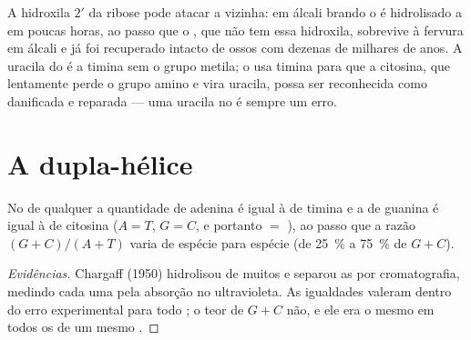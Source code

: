 \begin{example}\label{ex:b1:nucleic-acids:fragile}
A hidroxila $2'$ da ribose pode atacar a  vizinha:
em álcali brando o  é hidrolisado a  em poucas horas, ao
passo que o , que não tem essa hidroxila, sobrevive à fervura em
álcali e já foi recuperado intacto de ossos com dezenas de milhares de
anos. A uracila do  é a timina sem o grupo metila; o  usa timina
para que a citosina, que lentamente perde o grupo amino e vira uracila,
possa ser reconhecida como danificada e reparada --- uma uracila no 
é sempre um erro.
\end{example}

\section{A dupla-hélice}

\begin{proposition}\label{prop:b1:nucleic-acids:chargaff}
No  de qualquer  a quantidade de adenina é igual à de timina
e a de guanina é igual à de citosina ($A = T$, $G = C$, e portanto
 $=$ ), ao passo que a razão $(G + C)/(A + T)$ varia
de espécie para espécie (de \qty{25}{\%} a \qty{75}{\%} de $G + C$).
\end{proposition}
\begin{proof}[Evidências]
Chargaff (1950) hidrolisou  de muitos  e separou as 
por cromatografia, medindo cada uma pela absorção no ultravioleta. As
igualdades valeram dentro do erro experimental para todo ; o teor de
$G + C$ não, e ele era o mesmo em todos os  de um mesmo
.
\end{proof}

